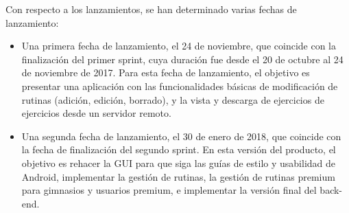 \documentclass[11pt,a4paper]{report}
\begin{document}
Con respecto a los lanzamientos, se han determinado varias fechas de lanzamiento:
\begin{itemize}
	\item Una primera fecha de lanzamiento, el 24 de noviembre, que coincide con la finalización del primer sprint, cuya duración fue desde el 20 de octubre al 24 de noviembre de 2017. Para esta fecha de lanzamiento, el objetivo es presentar una aplicación con las funcionalidades básicas de modificación de rutinas (adición, edición, borrado), y la  vista y descarga de ejercicios de ejercicios desde un servidor remoto.
	\item Una segunda fecha de lanzamiento, el 30 de enero de 2018,  que coincide con la fecha de finalización del segundo sprint. En esta versión del producto, el objetivo es rehacer la GUI para que siga las guías de estilo y usabilidad de Android, implementar la gestión de rutinas, la gestión de rutinas premium para gimnasios y usuarios premium, e implementar la versión final del back-end.
\end{itemize}

\end{document}
